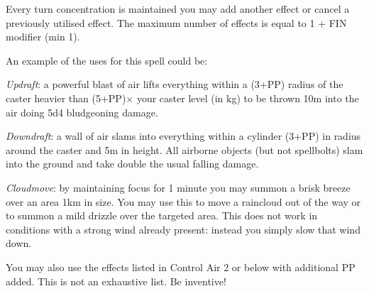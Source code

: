 \begin{multicols}{3}
{Every turn concentration is maintained you may add another effect\comma{} or cancel a previously utilised effect. The maximum number of effects is equal to 1 + FIN modifier (min 1). 

An example of the uses for this spell could be:

\begin{spellitemize}
\item {\it Updraft}: a powerful blast of air lifts everything within a (3+PP) radius of the caster heavier than (5+PP)$\times$ your caster level (in kg) to be thrown 10m into the air\comma{} doing 5d4 bludgeoning damage. 
\item {\it Downdraft}: a wall of air slams into everything within a cylinder  (3+PP) in radius around the caster and 5m in height. All airborne objects (but not spell\minus{}bolts) slam into the ground and take double the usual falling damage. 

\item {\it Cloudmove}: by maintaining focus for 1 minute\comma{} you may summon a brisk breeze over an area 1km in size. You may use this to move a raincloud out of the way\comma{} or to summon a mild drizzle over the targeted area. This does not work in conditions with a strong wind already present: instead you simply slow that wind down. 

\end{spellitemize}
You may also use the effects listed in Control Air 2 or below with \PPDifference{\DVAdpF}{\DVNovF} additional PP added. 
This is not an exhaustive list. Be inventive!}
\end{multicols}
